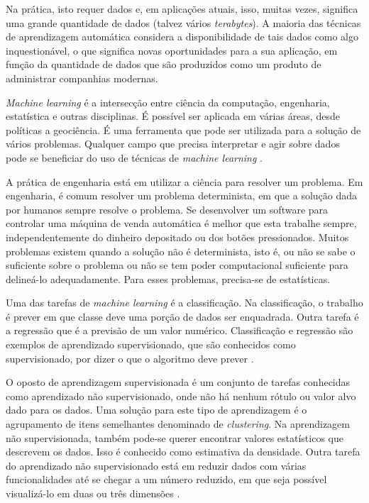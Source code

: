 Na prática, isto requer dados e, em aplicações atuais, isso, muitas vezes, significa uma grande quantidade de dados (talvez vários \textit{terabytes}). A maioria das técnicas de aprendizagem automática considera a disponibilidade de tais dados como algo inquestionável, o que significa novas oportunidades para a sua aplicação, em função da quantidade de dados que são produzidos como um produto de administrar companhias modernas.

\textit{Machine learning} é a intersecção entre ciência da computação, engenharia, estatística e outras disciplinas. É possível ser aplicada em várias áreas, desde políticas a geociência. É uma ferramenta que pode ser utilizada para a solução de vários problemas. Qualquer campo que precisa interpretar e agir sobre dados pode se beneficiar do uso de técnicas de \textit{machine learning} \cite{machine-hacker}.

A prática de engenharia está em utilizar a ciência para resolver um problema. Em engenharia, é comum resolver um problema determinista, em que a solução dada por humanos sempre resolve o problema. Se desenvolver um software para controlar uma máquina de venda automática é melhor que esta trabalhe sempre, independentemente do dinheiro depositado ou dos botões pressionados. Muitos problemas existem quando a solução não é determinista, isto é, ou não se sabe o suficiente sobre o problema ou não se tem poder computacional suficiente para delineá-lo adequadamente. Para esses problemas, precisa-se de estatísticas. 

Uma das tarefas de \textit{machine learning} é a classificação. Na classificação, o trabalho é prever em que classe deve uma porção de dados ser enquadrada. Outra tarefa é a regressão que é a previsão de um valor numérico. Classificação e regressão são exemplos de aprendizado supervisionado, que são conhecidos como supervisionado, por dizer o que o algoritmo deve prever \cite{machine-learning}.

O oposto de aprendizagem supervisionada é um conjunto de tarefas conhecidas como aprendizado não supervisionado, onde não há nenhum rótulo ou valor alvo dado para os dados. Uma solução para este tipo de aprendizagem é o agrupamento de itens semelhantes denominado de \textit{clustering}. Na aprendizagem não supervisionada, também pode-se querer encontrar valores estatísticos que descrevem os dados. Isso é conhecido como estimativa da densidade. Outra tarefa do aprendizado não supervisionado está em reduzir dados com várias funcionalidades até se chegar a um número reduzido, em que seja possível visualizá-lo em duas ou três dimensões \cite{machine-learning}.

